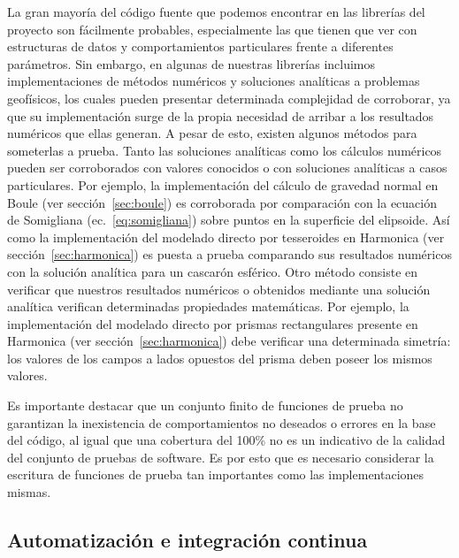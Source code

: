 La gran mayoría del código fuente que podemos encontrar en las librerías del
proyecto son fácilmente probables, especialmente las que tienen que ver con
estructuras de datos y comportamientos particulares frente a diferentes
parámetros.
Sin embargo, en algunas de nuestras librerías incluimos implementaciones de
métodos numéricos y soluciones analíticas a problemas geofísicos, los cuales
pueden presentar determinada complejidad de corroborar, ya que su
implementación surge de la propia necesidad de arribar a los resultados
numéricos que ellas generan.
A pesar de esto, existen algunos métodos para someterlas a prueba.
Tanto las soluciones analíticas como los cálculos numéricos pueden ser
corroborados con valores conocidos o con soluciones analíticas a casos
particulares.
Por ejemplo, la implementación del cálculo de gravedad normal en Boule (ver
sección~\ref{sec:boule}) es corroborada por comparación con la ecuación de
Somigliana (ec.~\ref{eq:somigliana}) sobre puntos en la superficie del
elipsoide.
Así como la implementación del modelado directo por tesseroides en Harmonica
(ver sección~\ref{sec:harmonica}) es puesta a prueba comparando sus resultados
numéricos con la solución analítica para un cascarón esférico.
Otro método consiste en verificar que nuestros resultados numéricos o obtenidos
mediante una solución analítica verifican determinadas propiedades matemáticas.
Por ejemplo, la implementación del modelado directo por prismas rectangulares
presente en Harmonica (ver sección~\ref{sec:harmonica}) debe verificar una
determinada simetría: los valores de los campos a lados opuestos del prisma
deben poseer los mismos valores.

Es importante destacar que un conjunto finito de funciones de prueba no
garantizan la inexistencia de comportamientos no deseados o errores en la base
del código, al igual que una cobertura del 100\% no es un indicativo de la
calidad del conjunto de pruebas de software.
Es por esto que es necesario considerar la escritura de funciones de prueba tan
importantes como las implementaciones mismas.


\subsection{Automatización e integración continua}
\label{sec:ci}





